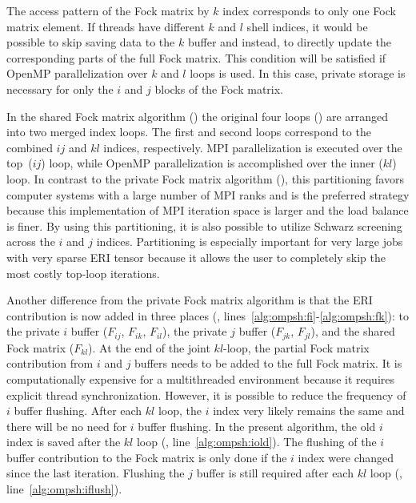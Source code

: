 The access pattern of the Fock matrix by $k$ index corresponds to only one Fock matrix element. If threads have different $k$ and $l$ shell indices, it would be possible to skip saving data to the $k$ buffer and instead, to directly update the corresponding parts of the full Fock matrix. This condition will be satisfied if OpenMP parallelization over $k$ and $l$ loops is used. In this case, private storage is necessary for only the $i$ and $j$ blocks of the Fock matrix.

In the shared Fock matrix algorithm () the original four loops () are arranged into two merged index loops. The first and second loops correspond to the combined $ij$ and $kl$ indices, respectively. MPI parallelization is executed over the top~($ij$) loop, while OpenMP parallelization is accomplished over the inner ($kl$) loop. In contrast to the private Fock matrix algorithm (), this partitioning favors computer systems with a large number of MPI ranks and is the preferred strategy because this implementation of MPI iteration space is larger and the load balance is finer. By using this partitioning, it is also possible to utilize Schwarz screening across the $i$ and $j$ indices. Partitioning is especially important for very large jobs with very sparse ERI tensor because it allows the user to completely skip the most costly top-loop iterations.

Another difference from the private Fock matrix algorithm is that the ERI contribution is now added in three places (, lines~\ref{alg:ompsh:fi}-\ref{alg:ompsh:fk}): to the private $i$ buffer ($F_{ij}$, $F_{ik}$, $F_{il}$), the private $j$ buffer ($F_{jk}$, $F_{jl}$), and the shared Fock matrix ($F_{kl}$). At the end of the joint $kl$-loop, the partial Fock matrix contribution from $i$ and $j$ buffers needs to be added to the full Fock matrix. It is computationally expensive for a multithreaded environment because it requires explicit thread synchronization. However, it is possible to reduce the frequency of $i$ buffer flushing. After each $kl$ loop, the $i$ index very likely remains the same and there will be no need for $i$ buffer flushing. In the present algorithm, the old $i$ index is saved after the $kl$ loop (, line~\ref{alg:ompsh:iold}). The flushing of the $i$ buffer contribution to the Fock matrix is only done if the $i$ index were changed since the last iteration. Flushing the $j$ buffer is still required after each $kl$ loop (, line~\ref{alg:ompsh:iflush}).

